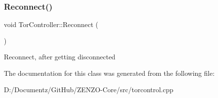 \subsubsection{\texorpdfstring{Reconnect()}{Reconnect()}}
{\footnotesize\ttfamily void Tor\+Controller\+::\+Reconnect (\begin{DoxyParamCaption}{ }\end{DoxyParamCaption})}

Reconnect, after getting disconnected 

The documentation for this class was generated from the following file\+:\begin{DoxyCompactItemize}
\item 
D\+:/\+Documentz/\+Git\+Hub/\+Z\+E\+N\+Z\+O-\/\+Core/src/torcontrol.\+cpp\end{DoxyCompactItemize}
